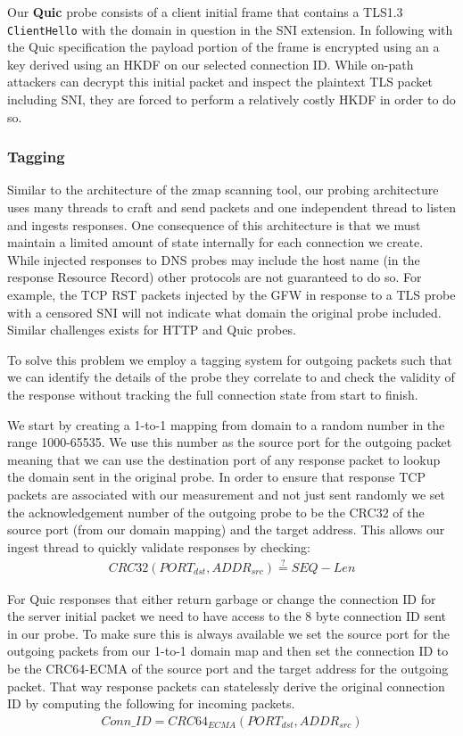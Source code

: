 Our \textbf{Quic} probe consists of a client initial frame that contains a
TLS1.3 {\tt ClientHello} with the domain in question in the SNI extension. In
following with the Quic specification the payload portion of the frame is
encrypted using an a key derived using an HKDF on our selected connection ID.
While on-path attackers can decrypt this initial packet and inspect the
plaintext TLS packet including SNI, they are forced to perform a relatively
costly HKDF in order to do so.

\subsubsection{Tagging}

Similar to the architecture of the zmap scanning tool, our probing architecture
uses many threads to craft and send packets and one independent thread to listen
and ingests responses. One consequence of this architecture is that we must
maintain a limited amount of state internally for each connection we create.
While injected responses to DNS probes may include the host name (in the
response Resource Record) other protocols are not guaranteed to do so. For
example, the TCP RST packets injected by the GFW in response to a TLS probe with
a censored SNI will not indicate what domain the original probe included.
Similar challenges exists for HTTP and Quic probes.

To solve this problem we employ a tagging system for outgoing packets such that
we can identify the details of the probe they correlate to and check the
validity of the response without tracking the full connection state from start
to finish.

We start by creating a 1-to-1 mapping from domain to a random number in the
range 1000-65535. We use this number as the source port for the outgoing packet
meaning that we can use the destination port of any response packet to lookup
the domain sent in the original probe. In order to ensure that response TCP
packets are associated with our measurement and not just sent randomly we set
the acknowledgement number of the outgoing probe to be the CRC32 of the source
port (from our domain mapping) and the target address. This allows our ingest
thread to quickly validate responses by checking:
\begin{gather*}
CRC32(PORT_{dst},ADDR_{src}) \stackrel{?}{=} SEQ - Len
\end{gather*}

For Quic responses that either return garbage or change the connection ID for
the server initial packet we need to have access to the 8 byte connection ID
sent in our probe. To make sure this is always available we set the source port
for the outgoing packets from our 1-to-1 domain map and then set the connection
ID to be the CRC64-ECMA of the source port and the target address for the
outgoing packet. That way response packets can statelessly derive the original
connection ID by computing the following for incoming packets.
\begin{gather*}
Conn\_ID = CRC64_{ECMA}(PORT_{dst},ADDR_{src})
\end{gather*}


